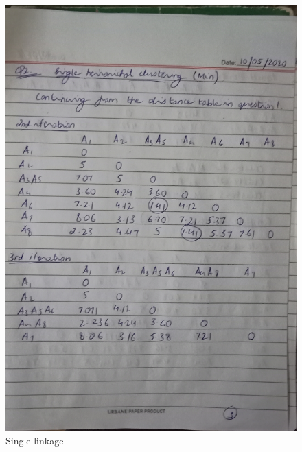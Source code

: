 \documentclass[12pt]{article}
\begin{document}
\begin{figure}
  \includegraphics[width=\linewidth]{3.jpg}
  \caption{Single linkage}
  \label{pic3}
\end{figure}
\end{document}

